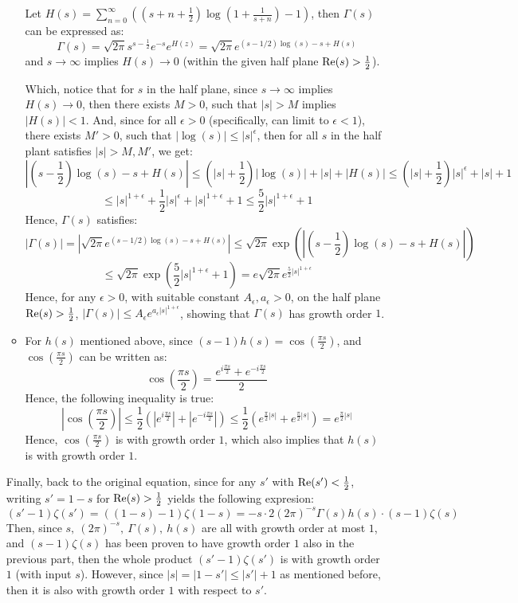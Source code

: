 \documentclass{article}
\begin{document}
\begin{itemize}
\begin{itemize}
        Let $H(s)=\sum_{n=0}^{\infty}\left(\left(s+n+\frac{1}{2}\right)\log\left(1+\frac{1}{s+n}\right)-1\right)$, then $\Gamma(s)$ can be expressed as:
        $$\Gamma(s)=\sqrt{2\pi}s^{s-\frac{1}{2}}e^{-s}e^{H(z)} = \sqrt{2\pi}e^{(s-1/2)\log(s)-s+H(s)}$$
        and $s\rightarrow\infty$ implies $H(s)\rightarrow 0$ (within the given half plane $\textmd{Re}(s)>\frac{1}{2}$).

        Which, notice that for $s$ in the half plane, since $s\rightarrow\infty$ implies $H(s)\rightarrow 0$, then there exists $M>0$, such that $|s|>M$ implies $|H(s)|<1$. And, since for all $\epsilon>0$ (specifically, can limit to $\epsilon<1$), there exists $M'>0$, such that $|\log(s)| \leq |s|^\epsilon$, then for all $s$ in the half plant satisfies $|s|>M,M'$, we get:
        $$\left|\left(s-\frac{1}{2}\right)\log(s)-s+H(s)\right| \leq \left(|s|+\frac{1}{2}\right)|\log(s)| + |s| + |H(s)| \leq \left(|s|+\frac{1}{2}\right)|s|^{\epsilon} + |s| + 1$$
        $$\leq |s|^{1+\epsilon}+\frac{1}{2}|s|^\epsilon+|s|^{1+\epsilon}+1 \leq \frac{5}{2}|s|^{1+\epsilon}+1$$
        Hence, $\Gamma(s)$ satisfies:
        $$|\Gamma(s)| = \left|\sqrt{2\pi}e^{(s-1/2)\log(s)-s+H(s)}\right| \leq \sqrt{2\pi}\exp\left(\left|\left(s-\frac{1}{2}\right)\log(s)-s+H(s)\right|\right)$$
        $$\leq \sqrt{2\pi}\exp\left(\frac{5}{2}|s|^{1+\epsilon}+1\right) = e\sqrt{2\pi}e^{\frac{5}{2}|s|^{1+\epsilon}}$$
        Hence, for any $\epsilon>0$, with suitable constant $A_\epsilon,a_\epsilon>0$, on the half plane $\textmd{Re}(s)>\frac{1}{2}$, $|\Gamma(s)|\leq A_\epsilon e^{a_\epsilon|s|^{1+\epsilon}}$, showing that $\Gamma(s)$ has growth order $1$.

        \item For $h(s)$ mentioned above, since $(s-1)h(s)=\cos\left(\frac{\pi s}{2}\right)$, and $\cos\left(\frac{\pi s}{2}\right)$ can be written as:
        $$\cos\left(\frac{\pi s}{2}\right) = \frac{e^{i\frac{\pi s}{2}}+e^{-i\frac{\pi s}{2}}}{2}$$
        Hence, the following inequality is true:
        $$\left|\cos\left(\frac{\pi s}{2}\right)\right| \leq \frac{1}{2}\left(|e^{i\frac{\pi s}{2}}| + |e^{-i\frac{\pi s}{2}}|\right) \leq \frac{1}{2}\left(e^{\frac{\pi}{2}|s|}+e^{\frac{\pi}{2}|s|}\right) = e^{\frac{\pi}{2}|s|}$$
        Hence, $\cos\left(\frac{\pi s}{2}\right)$ is with growth order $1$, which also implies that $h(s)$ is with growth order $1$.
    \end{itemize}
    Finally, back to the original equation, since for any $s'$ with $\textmd{Re}(s')<\frac{1}{2}$, writing $s' = 1-s$ for $\textmd{Re}(s)>\frac{1}{2}$ yields the following expresion:
    $$(s'-1)\zeta(s')=((1-s)-1)\zeta(1-s) = -s\cdot 2(2\pi)^{-s}\Gamma(s)h(s)\cdot (s-1)\zeta(s)$$
    Then, since $s,\ (2\pi)^{-s},\ \Gamma(s),\ h(s)$ are all with growth order at most $1$, and $(s-1)\zeta(s)$ has been proven to have growth order $1$ also in the previous part, then the whole product $(s'-1)\zeta(s')$ is with growth order $1$ (with input $s$). However, since $|s| = |1-s'| \leq |s'|+1$ as mentioned before, then it is also with growth order $1$ with respect to $s'$.


\end{itemize}
\end{document}
